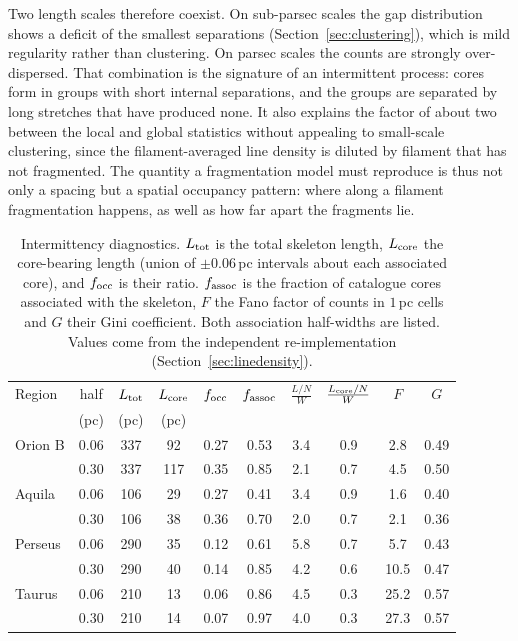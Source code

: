 \documentclass[usenatbib,twoside,twocolumn]{mnras}
\begin{document}
Two length scales therefore coexist. On sub-parsec scales the gap distribution shows a deficit of the smallest separations (Section~\ref{sec:clustering}), which is mild regularity rather than clustering. On parsec scales the counts are strongly over-dispersed. That combination is the signature of an intermittent process: cores form in groups with short internal separations, and the groups are separated by long stretches that have produced none. It also explains the factor of about two between the local and global statistics without appealing to small-scale clustering, since the filament-averaged line density is diluted by filament that has not fragmented. The quantity a fragmentation model must reproduce is thus not only a spacing but a spatial occupancy pattern: where along a filament fragmentation happens, as well as how far apart the fragments lie.

\begin{table}
\caption{Intermittency diagnostics. $L_{\rm tot}$ is the total skeleton length, $L_{\rm core}$ the core-bearing length (union of $\pm0.06$\,pc intervals about each associated core), and $f_{\rm occ}$ is their ratio. $f_{\rm assoc}$ is the fraction of catalogue cores associated with the skeleton, $F$ the Fano factor of counts in $1$\,pc cells and $G$ their Gini coefficient. Both association half-widths are listed. Values come from the independent re-implementation (Section~\ref{sec:linedensity}).}
\label{tab:intermittency}
\footnotesize
\setlength{\tabcolsep}{3pt}
\begin{tabular}{lccccccccc}
\toprule
Region & half & $L_{\rm tot}$ & $L_{\rm core}$ & $f_{\rm occ}$ & $f_{\rm assoc}$ & $\frac{L/N}{W}$ & $\frac{L_{\rm core}/N}{W}$ & $F$ & $G$ \\
       & (pc) & (pc) & (pc) & & & & & & \\
\midrule
Orion B & 0.06 & 337 & 92 & 0.27 & 0.53 & 3.4 & 0.9 & 2.8 & 0.49 \\
        & 0.30 & 337 & 117 & 0.35 & 0.85 & 2.1 & 0.7 & 4.5 & 0.50 \\
Aquila  & 0.06 & 106 & 29 & 0.27 & 0.41 & 3.4 & 0.9 & 1.6 & 0.40 \\
        & 0.30 & 106 & 38 & 0.36 & 0.70 & 2.0 & 0.7 & 2.1 & 0.36 \\
Perseus & 0.06 & 290 & 35 & 0.12 & 0.61 & 5.8 & 0.7 & 5.7 & 0.43 \\
        & 0.30 & 290 & 40 & 0.14 & 0.85 & 4.2 & 0.6 & 10.5 & 0.47 \\
Taurus  & 0.06 & 210 & 13 & 0.06 & 0.86 & 4.5 & 0.3 & 25.2 & 0.57 \\
        & 0.30 & 210 & 14 & 0.07 & 0.97 & 4.0 & 0.3 & 27.3 & 0.57 \\
\bottomrule
\end{tabular}
\end{table}
\end{document}
